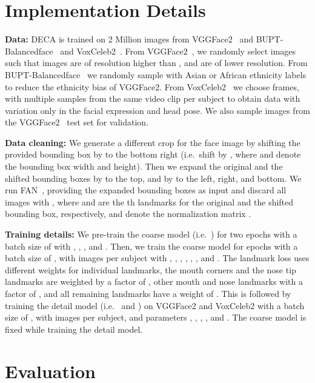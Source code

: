 \documentclass[final]{cvpr}
\newcommand{\qheading}[1]{\noindent\textbf{#1}}
\newcommand{\modelname}{DECA\xspace}
\begin{document}
\newpage


\begin{appendices}
\section{Implementation Details}

\qheading{Data:}
\modelname is trained on 2 Million images from \mbox{VGGFace2}~\cite{Cao2018_VGGFace2} and BUPT-Balancedface~\cite{Wang_2019_ICCV} and VoxCeleb2~\cite{Chung18b}.
From VGGFace2~\cite{Cao2018_VGGFace2}, we randomly select  images such that  images are of resolution higher than , and  are of lower resolution.
From BUPT-Balancedface~\cite{Wang_2019_ICCV} we randomly sample  with Asian or African ethnicity labels to reduce the ethnicity bias of VGGFace2. 
From VoxCeleb2~\cite{Chung18b} we choose  frames, with multiple samples from the same video clip per subject to obtain data with variation only in the facial expression and head pose.
We also sample  images from the VGGFace2~\cite{Cao2018_VGGFace2} test set for validation. 

\qheading{Data cleaning:}
We generate a different crop for the face image by shifting the provided bounding box by  to the bottom right (i.e.~shift by , where  and  denote the bounding box width and height).
Then we expand the original and the shifted bounding boxes by  to the top, and by  to the left, right, and bottom.
We run FAN~\cite{Bulat2017}, providing the expanded bounding boxes as input and discard all images with , where  and  are the th landmarks for the original and the shifted bounding box, respectively, and  denote the normalization matrix .

\qheading{Training details:}
We pre-train the coarse model (i.e.~) for two epochs with a batch size of  with , , , and .
Then, we train the coarse model for  epochs with a batch size of , with  images per subject with , , , , ,  , and .
The landmark loss uses different weights for individual landmarks, the mouth corners and the nose tip landmarks are weighted by a factor of , other mouth and nose landmarks with a factor of , and all remaining landmarks have a weight of .
This is followed by training the detail model (i.e.~ and ) on VGGFace2 and VoxCeleb2 with a batch size of , with  images per subject, and parameters , , , , and .
The coarse model is fixed while training the detail model. 



\section{Evaluation}




\end{appendices}
\end{document}
